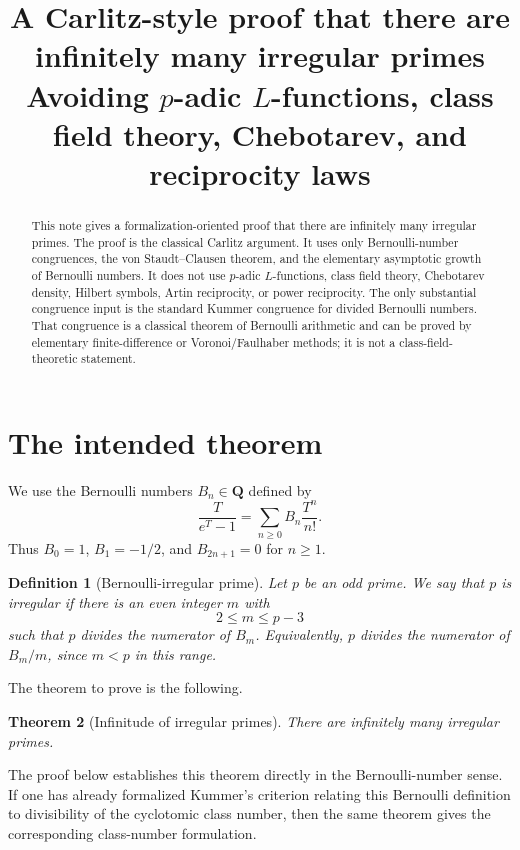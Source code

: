 \documentclass[11pt]{article}
\title{A Carlitz-style proof that there are infinitely many irregular primes\\
\large Avoiding $p$-adic $L$-functions, class field theory, Chebotarev, and reciprocity laws}
\author{}
\date{}
\newtheorem{theorem}{Theorem}[section]
\newtheorem{definition}[theorem]{Definition}
\newcommand{\Q}{\mathbf Q}
\begin{document}
\maketitle

\begin{abstract}
This note gives a formalization-oriented proof that there are infinitely many irregular primes.  The proof is the classical Carlitz argument.  It uses only Bernoulli-number congruences, the von Staudt--Clausen theorem, and the elementary asymptotic growth of Bernoulli numbers.  It does not use $p$-adic $L$-functions, class field theory, Chebotarev density, Hilbert symbols, Artin reciprocity, or power reciprocity.  The only substantial congruence input is the standard Kummer congruence for divided Bernoulli numbers.  That congruence is a classical theorem of Bernoulli arithmetic and can be proved by elementary finite-difference or Voronoi/Faulhaber methods; it is not a class-field-theoretic statement.
\end{abstract}

\tableofcontents

\section{The intended theorem}

We use the Bernoulli numbers $B_n\in \Q$ defined by
\[
  \frac{T}{e^T-1}=\sum_{n\ge 0} B_n\frac{T^n}{n!}.
\]
Thus $B_0=1$, $B_1=-1/2$, and $B_{2n+1}=0$ for $n\ge 1$.

\begin{definition}[Bernoulli-irregular prime]
Let $p$ be an odd prime.  We say that $p$ is \emph{irregular} if there is an even integer $m$ with
\[
  2\le m\le p-3
\]
such that $p$ divides the numerator of $B_m$.
Equivalently, $p$ divides the numerator of $B_m/m$, since $m<p$ in this range.
\end{definition}

The theorem to prove is the following.

\begin{theorem}[Infinitude of irregular primes]
There are infinitely many irregular primes.
\end{theorem}

The proof below establishes this theorem directly in the Bernoulli-number sense.  If one has already formalized Kummer's criterion relating this Bernoulli definition to divisibility of the cyclotomic class number, then the same theorem gives the corresponding class-number formulation.
\end{document}
